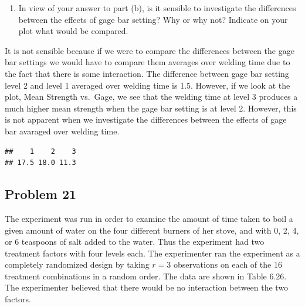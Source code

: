\documentclass[12pt,]{article}
\newenvironment{Shaded}{\begin{snugshade}}{\end{snugshade}}
\newcommand{\KeywordTok}[1]{\textcolor[rgb]{0.13,0.29,0.53}{\textbf{#1}}}
\newcommand{\StringTok}[1]{\textcolor[rgb]{0.31,0.60,0.02}{#1}}
\newcommand{\OperatorTok}[1]{\textcolor[rgb]{0.81,0.36,0.00}{\textbf{#1}}}
\newcommand{\NormalTok}[1]{#1}
\providecommand{\tightlist}{%
  \setlength{\itemsep}{0pt}\setlength{\parskip}{0pt}}
\begin{document}
\begin{enumerate}
\def\labelenumi{(\alph{enumi})}
\setcounter{enumi}{2}
\tightlist
\item
  In view of your answer to part (b), is it sensible to investigate the
  differences between the effects of gage bar setting? Why or why not?
  Indicate on your plot what would be compared.
\end{enumerate}

It is not sensible because if we were to compare the differences between
the gage bar settings we would have to compare them averages over
welding time due to the fact that there is some interaction. The
difference between gage bar setting level 2 and level 1 averaged over
welding time is 1.5. However, if we look at the plot, Mean Strength
vs.~Gage, we see that the welding time at level 3 produces a much higher
mean strength when the gage bar setting is at level 2. However, this is
not apparent when we investigate the differences between the effects of
gage bar avaraged over welding time.

\begin{Shaded}
\end{Shaded}

\begin{verbatim}
##    1    2    3 
## 17.5 18.0 11.3
\end{verbatim}

\subsection{Problem 21}\label{problem-21}

The experiment was run in order to examine the amount of time taken to
boil a given amount of water on the four different burners of her stove,
and with 0, 2, 4, or 6 teaspoons of salt added to the water. Thus the
experiment had two treatment factors with four levels each. The
experimenter ran the experiment as a completely randomized design by
taking \(r = 3\) observations on each of the 16 treatment combinations
in a random order. The data are shown in Table 6.26. The experimenter
believed that there would be no interaction between the two factors.
\end{document}
